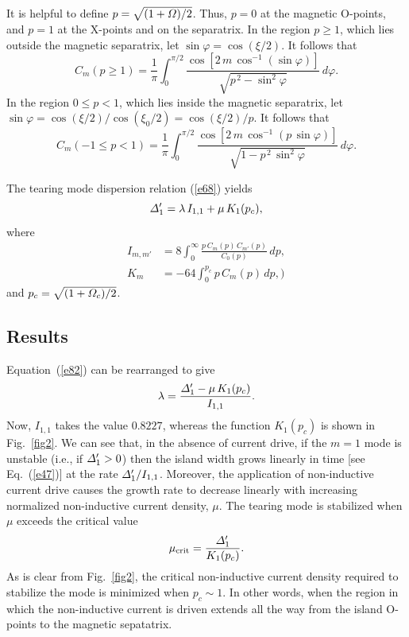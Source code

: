 \documentclass[12pt,prb,aps]{revtex4-1}
\begin{document}
It is helpful to define $p = \sqrt{(1+{\mit\Omega})/2}$. Thus, $p=0$ at the magnetic O-points, and $p=1$ at the
X-points and on the separatrix. In the region $p\geq1$, which lies outside the magnetic separatrix, let $\sin\varphi = \cos(\xi/2)$. 
It follows that 
\begin{equation}
 C_m(p\geq 1)=\frac{1}{\pi} \int_{0}^{\pi/2}\frac{\cos[2\,m\,\cos^{-1}(\sin\varphi)]}
 {\sqrt{p^{\,2}-\sin^2\varphi}}\,d\varphi.
\end{equation}
In the region $0\leq p< 1$, which lies inside the magnetic separatrix, let 
$\sin\varphi = \cos(\xi/2)/\cos(\xi_0/2)=\cos(\xi/2)/p$.
 It follows that 
\begin{equation}
 C_m(-1\leq p< 1)=\frac{1}{\pi} \int_{0}^{\pi/2}\frac{\cos[2\,m\,\cos^{-1}(p\,\sin\varphi)]}
 {\sqrt{1-p^{\,2}\,\sin^2\varphi}}\,d\varphi.
\end{equation}

The tearing mode dispersion relation (\ref{e68}) yields
\begin{equation}\label{e82}
{\mit\Delta}_1' = \lambda\,I_{1,1}+\mu\,K_1(p_c),
\end{equation}
where
\begin{align}
I_{m,m'} &= 8\int_0^\infty\frac{p\,C_m(p)\,C_{m'}(p)}{C_0(p)}\,dp,\\[0.5ex]
K_m &= -64 \int_0^{p_c} p\,C_m(p)\,dp,\label{e84})
\end{align}
and $p_c= \sqrt{(1+{\mit\Omega}_c)/2}$. 

\subsection{Results}
Equation~(\ref{e82}) can be rearranged to give
\begin{equation}
\lambda = \frac{{\mit\Delta}_1'-\mu\,K_1(p_c)}{I_{1,1}}.
\end{equation}
Now, $I_{1,1}$ takes the value $0.8227$, whereas the function $K_1(p_c)$ is shown in Fig.~\ref{fig2}. 
We can see that, in the absence of current drive, if the $m=1$ mode is unstable (i.e., if ${\mit\Delta}_1'> 0$) then the island width grows linearly in time  [see Eq.~(\ref{e47})] at the rate ${\mit\Delta}_1'/I_{1,1}$.\cite{ruth}
Moreover, the application of non-inductive current drive causes the growth rate to decrease linearly with
increasing normalized non-inductive current density, $\mu$. The tearing mode is stabilized when $\mu$ exceeds the critical value
\begin{equation}
\mu_{\rm crit} =\frac{{\mit\Delta}_1'}{K_1(p_c)}.
\end{equation}
As is clear from Fig.~\ref{fig2}, the critical non-inductive current density required to stabilize the mode is minimized when $p_c\sim 1$. In other words, when the region in which the non-inductive current is driven extends all the way from the island O-points to the magnetic sepatatrix.  
\end{document}

